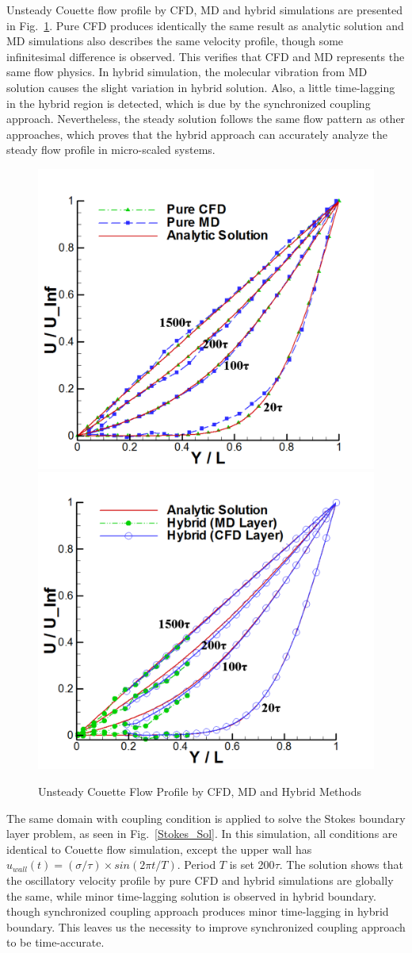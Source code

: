 \documentclass{CFD2010paper}
\begin{document}
Unsteady Couette flow profile by CFD, MD and hybrid simulations are presented in Fig.~\ref{Flat_Plate_Sol}. Pure CFD produces identically the same result as analytic solution and MD simulations also describes the same velocity profile, though some infinitesimal difference is observed. This verifies that CFD and MD represents the same flow physics. In hybrid simulation, the molecular vibration from MD solution causes the slight variation in hybrid solution. Also, a little time-lagging in the hybrid region is detected, which is due by the synchronized coupling approach. Nevertheless, the steady solution follows the same flow pattern as other approaches, which proves that the hybrid approach can accurately analyze the steady flow profile in micro-scaled systems.

%
\begin{figure}[ht]
\centering
\includegraphics[width=0.4\linewidth]{Flat_Plate_Sol1.pdf}
\hskip 1cm
\includegraphics[width=0.4\linewidth]{Flat_Plate_Sol2.pdf}
\vskip-0.2cm
\caption{Unsteady Couette Flow Profile by CFD, MD and Hybrid Methods}
\label{Flat_Plate_Sol}
\end{figure}



The same domain with coupling condition is applied to solve the Stokes boundary layer problem, as seen in Fig.~\ref{Stokes_Sol}. In this simulation, all conditions are identical to Couette flow simulation, except the upper wall has $u_{wall}(t)=({\sigma}/{\tau}){\times}sin(2{\pi}t/T)$. Period $T$ is set 200$\tau$. The solution shows that the oscillatory velocity profile by pure CFD and hybrid simulations are globally the same, while minor time-lagging solution is observed in hybrid boundary. though synchronized coupling approach produces minor time-lagging in hybrid boundary. This leaves us the necessity to improve synchronized coupling approach to be time-accurate.
\end{document}
